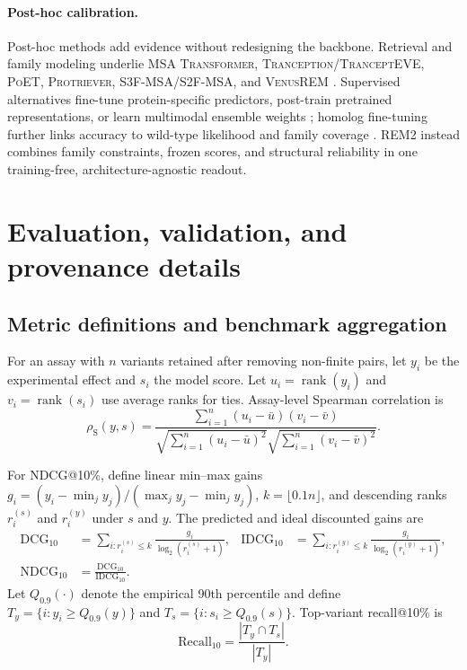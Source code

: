 \documentclass{article} %
\begin{document}
\paragraph{Post-hoc calibration.}
Post-hoc methods add evidence without redesigning the backbone. Retrieval and family modeling underlie \textsc{MSA Transformer}, \textsc{Tranception}/\textsc{TranceptEVE}, \textsc{PoET}, \textsc{Protriever}, \textsc{S3F-MSA}/\textsc{S2F-MSA}, and \textsc{VenusREM} \citep{rao2021msa,notin2022tranception,notin2022trancepteve,truong2023poet,notin2025protriever,zhang2024s3f,tan2025venusrem}. Supervised alternatives fine-tune protein-specific predictors, post-train pretrained representations, or learn multimodal ensemble weights \citep{zhou2024protlgn,ouyang2024predicting,tan2026rank}; homolog fine-tuning further links accuracy to wild-type likelihood and family coverage \citep{gordon2025preference}. \textsc{REM2} instead combines family constraints, frozen scores, and structural reliability in one training-free, architecture-agnostic readout.

\section{Evaluation, validation, and provenance details}
\label{app:evaluation_details}

\subsection{Metric definitions and benchmark aggregation}
For an assay with $n$ variants retained after removing non-finite pairs, let $y_i$ be the experimental effect and $s_i$ the model score. Let $u_i=\operatorname{rank}(y_i)$ and $v_i=\operatorname{rank}(s_i)$ use average ranks for ties. Assay-level Spearman correlation is
\begin{equation}
\rho_{\mathrm{S}}(y,s)=
\frac{\sum_{i=1}^{n}(u_i-\bar u)(v_i-\bar v)}
{\sqrt{\sum_{i=1}^{n}(u_i-\bar u)^2}\sqrt{\sum_{i=1}^{n}(v_i-\bar v)^2}}.
\label{eq:metric_spearman}
\end{equation}

For NDCG@10\%, define linear min--max gains $g_i=(y_i-\min_j y_j)/(\max_j y_j-\min_j y_j)$, $k=\lfloor0.1n\rfloor$, and descending ranks $r_i^{(s)}$ and $r_i^{(y)}$ under $s$ and $y$. The predicted and ideal discounted gains are
\begin{equation}
\begin{aligned}
\mathrm{DCG}_{10}
&=\sum_{i:r_i^{(s)}\le k}\frac{g_i}{\log_2(r_i^{(s)}+1)}, &
\mathrm{IDCG}_{10}
&=\sum_{i:r_i^{(y)}\le k}\frac{g_i}{\log_2(r_i^{(y)}+1)},\\
\mathrm{NDCG}_{10}
&=\frac{\mathrm{DCG}_{10}}{\mathrm{IDCG}_{10}}. & &
\end{aligned}
\label{eq:metric_ndcg}
\end{equation}
Let $Q_{0.9}(\cdot)$ denote the empirical 90th percentile and define $T_y=\{i:y_i\ge Q_{0.9}(y)\}$ and $T_s=\{i:s_i\ge Q_{0.9}(s)\}$. Top-variant recall@10\% is
\begin{equation}
\mathrm{Recall}_{10}=\frac{|T_y\cap T_s|}{|T_y|}.
\label{eq:metric_toprecall}
\end{equation}
\end{document}
